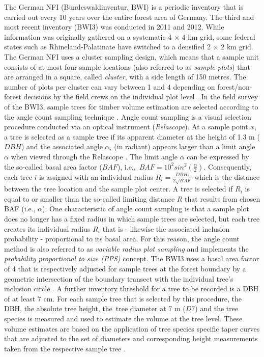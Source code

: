 \documentclass[remotesensing,article,accept,moreauthors,pdftex,10pt,a4paper]{Definitions/mdpi}
\begin{document}
The German NFI (Bundeswaldinventur, BWI) is a periodic inventory that is carried out every 10 years over the entire forest area of Germany. The third and most recent inventory (BWI3) was conducted in 2011 and 2012. While information was originally gathered on a systematic 4 $\times$ 4 km grid, some federal states such as Rhineland-Palatinate have switched to a densified 2 $\times$ 2 km grid. The German NFI uses a cluster sampling design, which means that a sample unit consists of at most four sample locations (also referred to as \textit{sample plots}) that are arranged in a square, called \textit{cluster}, with a side length of 150 metres. The number of plots per cluster can vary between 1 and 4 depending on forest/non-forest decisions by the field crews on the individual plot level \citep{bwi3_aufn}. In the field survey of the BWI3, sample trees for timber volume estimation are selected according to the angle count sampling technique \citep{bitterlich1984}. Angle count sampling is a visual selection procedure conducted via an optical instrument (\textit{Relascope}). At a sample point $x$, a tree is selected as a sample tree if its apparent diameter at the height of 1.3 m ($DBH$) and the associated angle $\alpha_i$ (in radiant) appears larger than a limit angle $\alpha$ when viewed through the Relascope \citep{mandallaz2008}. The limit angle $\alpha{}$ can be expressed by the so-called basal area factor ($BAF$), i.e.,~$BAF  =  10^{2}sin^{2}(\frac{\alpha}{2})$. Consequently, each tree $i$ is assigned with an individual radius $R_{i} = \frac{DBH_{i}}{2\sqrt{BAF}}$ which is the distance between the tree location and the sample plot center. A tree is selected if $R_{i}$ is equal to or smaller than the so-called limiting distance $R$ that results from chosen BAF (i.e., $\alpha$). One characteristic of angle count sampling is that a sample plot does no longer has a fixed radius in which sample trees are selected, but each tree creates its individual radius $R_i$ that is - likewise the associated inclusion probability - proportional to its basal area. For this reason, the angle count method is also referred to as \textit{variable radius plot sampling} and implements the \textit{probability proportional to size (PPS)} concept. The BWI3 uses a basal area factor of 4 that is respectively adjusted for sample trees at the forest boundary by a geometric intersection of the boundary transect with the individual tree's inclusion circle \citep{bwi3_aufn}. A further inventory threshold for a tree to be recorded is a DBH of at least 7 cm. For each sample tree that is selected by this procedure, the DBH, the absolute tree height, the~tree diameter at 7 m ($D7$) and the tree species is measured and used to estimate the volume at the tree level. These volume estimates are based on the application of tree species specific taper curves that are adjusted to the set of diameters and corresponding height measurements taken from the respective sample tree \citep{kublin2013}.
\end{document}
